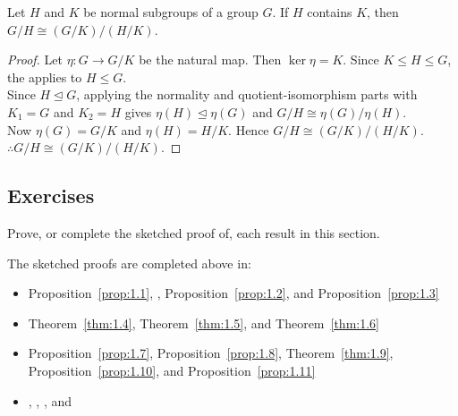 \documentclass[../Odyssey_Project.tex]{subfiles}
\begin{document}
\begin{namedtheorem}
\label{thm:second-iso}
Let $H$ and $K$ be normal subgroups of a group $G$. If $H$ contains $K$, then $G/H \cong (G/K)/(H/K)$.
\end{namedtheorem}
\begin{proof}
    Let \(\eta \colon G \to G/K\) be the natural map. Then \(\ker \eta = K\). Since \(K \leq H \leq G\), the  applies to \(H \leq G\). \\
    Since \(H \trianglelefteq G\), applying the normality and quotient-isomorphism parts with \(K_1 = G\) and \(K_2 = H\) gives \(\eta(H) \trianglelefteq \eta(G)\) and \(G/H \cong \eta(G)/\eta(H)\). \\
    Now \(\eta(G) = G/K\) and \(\eta(H) = H/K\). Hence \(G/H \cong (G/K)/(H/K)\). \\
    \(\therefore G/H \cong (G/K)/(H/K)\).
\end{proof}

\subsection*{Exercises}

\begin{exercise}
\label{ex:1.1}
Prove, or complete the sketched proof of, each result in this section.
\end{exercise}
\begin{solution}
The sketched proofs are completed above in:
\begin{itemize}
    \item Proposition~\ref{prop:1.1}, , Proposition~\ref{prop:1.2}, and Proposition~\ref{prop:1.3}
    \item Theorem~\ref{thm:1.4}, Theorem~\ref{thm:1.5}, and Theorem~\ref{thm:1.6}
    \item Proposition~\ref{prop:1.7}, Proposition~\ref{prop:1.8}, Theorem~\ref{thm:1.9}, Proposition~\ref{prop:1.10}, and Proposition~\ref{prop:1.11}
    \item {}, , , and 
\end{itemize}
\end{solution}
\end{document}
